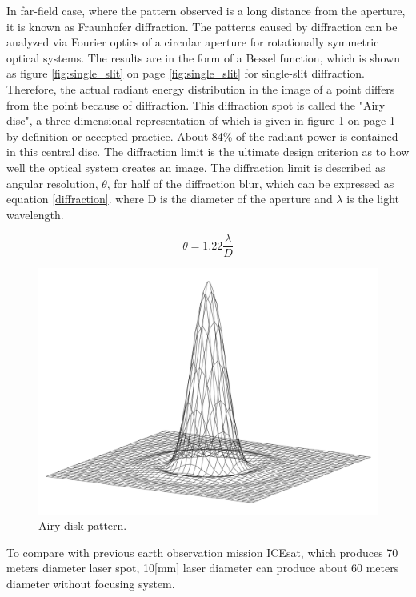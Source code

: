 In far-field case, where the pattern observed is a long distance from the aperture, it is known as Fraunhofer diffraction. The patterns caused by diffraction can be analyzed via Fourier optics of a circular aperture for rotationally symmetric optical systems. The results are in the form of a Bessel function, which is shown as figure \ref{fig:single_slit} on page \ref{fig:single_slit} for single-slit diffraction. Therefore, the actual radiant energy distribution in the image of a point differs from the point because of diffraction. This diffraction spot is called the "Airy disc", a three-dimensional representation of which is given in figure \ref{fig:airydisk} on page \ref{fig:airydisk} by definition or accepted practice. About 84\% of the radiant power is contained in this central disc. The diffraction limit is the ultimate design criterion as to how well the optical system creates an image. The diffraction limit is described as angular resolution, $\theta$, for half of the diffraction blur, which can be expressed as equation \ref{diffraction}. where D is the diameter of the aperture and $\lambda$ is the light wavelength.

\begin{equation}
\label{diffraction}
\theta = 1.22\frac{\lambda}{D}
\end {equation}

\begin{figure}[ht!]
\centering
\includegraphics[scale = 0.15]{chapters/img/diffraction_airydisk.png}
\caption{Airy disk pattern.}
\label{fig:airydisk}
\end{figure}

To compare with previous earth observation mission \acs{ICEsat}, which produces 70 meters diameter laser spot, 10[mm] laser diameter can produce about 60 meters diameter without focusing system. 